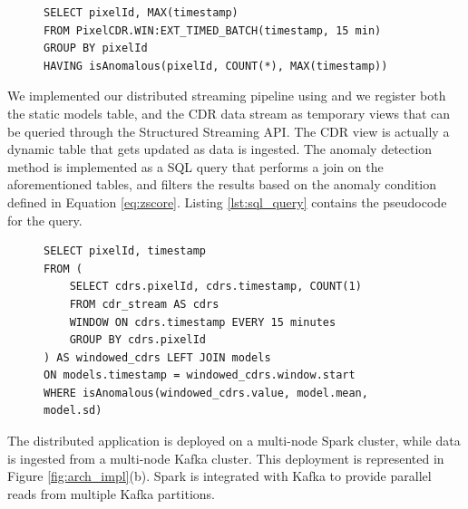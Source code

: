 {\begin{figure}[ht]
\begin{minipage}{0.95\linewidth}
\begin{lstlisting}[caption={EPL query performed by Esper Processor.},frame=single,captionpos=b,label=lst:epl_query,style=ESPER]
SELECT pixelId, MAX(timestamp)
FROM PixelCDR.WIN:EXT_TIMED_BATCH(timestamp, 15 min) 
GROUP BY pixelId 
HAVING isAnomalous(pixelId, COUNT(*), MAX(timestamp))
\end{lstlisting}
\end{minipage}
\end{figure}

We implemented our distributed streaming pipeline using \sparkdi{} and we register both the static models table, and the CDR data stream as temporary views that can be queried through the Structured Streaming API. The CDR view is actually a dynamic table that gets updated as data is ingested. The anomaly detection method is implemented as a SQL query that performs a join on the aforementioned tables, and filters the results based on the anomaly condition defined in Equation \eqref{eq:zscore}. Listing \ref{lst:sql_query} contains the pseudocode for the query.

\begin{figure}[ht]
\begin{minipage}{0.95\linewidth}
\begin{lstlisting}[caption={Spark SQL anomaly detection query.},frame=single,captionpos=b,label=lst:sql_query,style=SPARKSQL]
SELECT pixelId, timestamp
FROM (
	SELECT cdrs.pixelId, cdrs.timestamp, COUNT(1)
	FROM cdr_stream AS cdrs
	WINDOW ON cdrs.timestamp EVERY 15 minutes
	GROUP BY cdrs.pixelId
) AS windowed_cdrs LEFT JOIN models 
ON models.timestamp = windowed_cdrs.window.start 
WHERE isAnomalous(windowed_cdrs.value, model.mean, model.sd)
\end{lstlisting}
\end{minipage}
\end{figure}

The distributed application is deployed on a multi-node Spark cluster, while data is ingested from a multi-node Kafka cluster. This deployment is represented in Figure \ref{fig:arch_impl}(b). Spark is integrated with Kafka to provide parallel reads from multiple Kafka partitions. 

}
